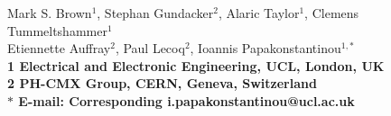 Mark S. Brown${}^1$, Stephan Gundacker${}^2$, Alaric Taylor${}^1$,
Clemens Tummeltshammer${}^1$\\Etiennette Auffray${}^2$, Paul
Lecoq${}^2$, Ioannis Papakonstantinou${}^{1,\ast}$
\\
\bf{1} Electrical and Electronic Engineering, UCL, London, UK
\\
\bf{2} PH-CMX Group, CERN, Geneva, Switzerland
\\
$\ast$ E-mail: Corresponding i.papakonstantinou@ucl.ac.uk